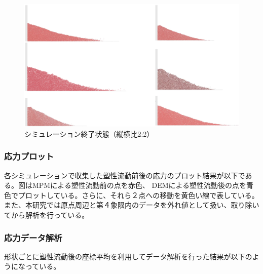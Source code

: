 \documentclass[12pt]{ltjsarticle}
\begin{document}
\begin{figure}[htbp]
      \centering
      \includegraphics*[keepaspectratio, scale=0.35]{2_2_nagasu.PNG}
      \caption{シミュレーション終了状態（縦横比2:2）}
\end{figure}


\subsubsection{応力プロット}
各シミュレーションで収集した塑性流動前後の応力のプロット結果が以下である。図はMPMによる塑性流動前の点を赤色、
DEMによる塑性流動後の点を青色でプロットしている。さらに、それら２点への移動を黄色い線で表している。
また、本研究では原点周辺と第４象限内のデータを外れ値として扱い、取り除いてから解析を行っている。

\subsubsection{応力データ解析}
形状ごとに塑性流動後の座標平均を利用してデータ解析を行った結果が以下のようになっている。
\end{document}
